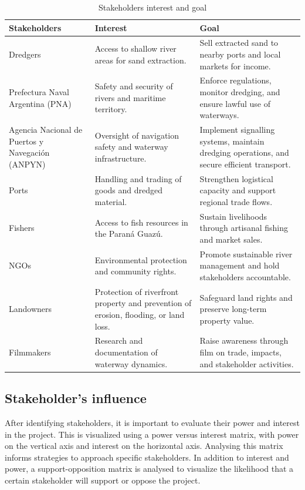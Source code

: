 \begin{table}[H]
\centering
\caption{Stakeholders interest and goal}
\begin{tabularx}{\linewidth}{p{3.5cm}XX}
\toprule
Stakeholders & Interest & Goal \\
\midrule
Dredgers & Access to shallow river areas for sand extraction. & Sell extracted sand to nearby ports and local markets for income. \\
\midrule
Prefectura Naval Argentina (PNA) & Safety and security of rivers and maritime territory. & Enforce regulations, monitor dredging, and ensure lawful use of waterways. \\
\midrule
Agencia Nacional de Puertos y Navegación (ANPYN) & Oversight of navigation safety and waterway infrastructure. & Implement signalling systems, maintain dredging operations, and secure efficient transport. \\
\midrule
Ports & Handling and trading of goods and dredged material. & Strengthen logistical capacity and support regional trade flows. \\
\midrule
Fishers & Access to fish resources in the Paraná Guazú. & Sustain livelihoods through artisanal fishing and market sales. \\
\midrule
NGOs & Environmental protection and community rights. & Promote sustainable river management and hold stakeholders accountable. \\
\midrule
Landowners & Protection of riverfront property and prevention of erosion, flooding, or land loss. & Safeguard land rights and preserve long-term property value. \\
\midrule
Filmmakers & Research and documentation of waterway dynamics. & Raise awareness through film on trade, impacts, and stakeholder activities. \\
\bottomrule
\end{tabularx}

\label{tab:stakeholders-interests-goals}
\end{table}

\subsection{Stakeholder's influence}
After identifying stakeholders, it is important to evaluate their power and interest in the project. This is visualized using a power versus interest matrix, with power on the vertical axis and interest on the horizontal axis. Analysing this matrix informs strategies to approach specific stakeholders. In addition to interest and power, a support-opposition matrix is analysed to visualize the likelihood that a certain stakeholder will support or oppose the project.

